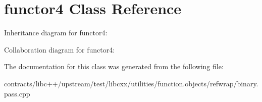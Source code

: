 \hypertarget{classfunctor4}{}\section{functor4 Class Reference}
\label{classfunctor4}


Inheritance diagram for functor4\+:


Collaboration diagram for functor4\+:


The documentation for this class was generated from the following file\+:\begin{DoxyCompactItemize}
\item 
contracts/libc++/upstream/test/libcxx/utilities/function.\+objects/refwrap/binary.\+pass.\+cpp\end{DoxyCompactItemize}
